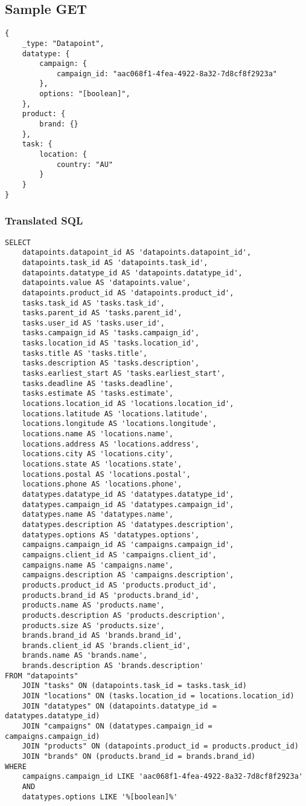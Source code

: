 \documentclass{article}
\begin{document}
\subsection{Sample GET}
\linespread{1}
\begin{lstlisting}
{
	_type: "Datapoint",
	datatype: {
		campaign: {
			campaign_id: "aac068f1-4fea-4922-8a32-7d8cf8f2923a"
		},
		options: "[boolean]",
	},
	product: {
		brand: {}
	},
	task: {
		location: {
			country: "AU"
		}
	}
}
\end{lstlisting}
\subsubsection{Translated SQL}
\begin{lstlisting}
SELECT
	datapoints.datapoint_id AS 'datapoints.datapoint_id',
	datapoints.task_id AS 'datapoints.task_id',
	datapoints.datatype_id AS 'datapoints.datatype_id',
	datapoints.value AS 'datapoints.value',
	datapoints.product_id AS 'datapoints.product_id',
	tasks.task_id AS 'tasks.task_id',
	tasks.parent_id AS 'tasks.parent_id',
	tasks.user_id AS 'tasks.user_id',
	tasks.campaign_id AS 'tasks.campaign_id',
	tasks.location_id AS 'tasks.location_id',
	tasks.title AS 'tasks.title',
	tasks.description AS 'tasks.description',
	tasks.earliest_start AS 'tasks.earliest_start',
	tasks.deadline AS 'tasks.deadline',
	tasks.estimate AS 'tasks.estimate',
	locations.location_id AS 'locations.location_id',
	locations.latitude AS 'locations.latitude',
	locations.longitude AS 'locations.longitude',
	locations.name AS 'locations.name',
	locations.address AS 'locations.address',
	locations.city AS 'locations.city',
	locations.state AS 'locations.state',
	locations.postal AS 'locations.postal',
	locations.phone AS 'locations.phone',
	datatypes.datatype_id AS 'datatypes.datatype_id',
	datatypes.campaign_id AS 'datatypes.campaign_id',
	datatypes.name AS 'datatypes.name',
	datatypes.description AS 'datatypes.description',
	datatypes.options AS 'datatypes.options',
	campaigns.campaign_id AS 'campaigns.campaign_id',
	campaigns.client_id AS 'campaigns.client_id',
	campaigns.name AS 'campaigns.name',
	campaigns.description AS 'campaigns.description',
	products.product_id AS 'products.product_id',
	products.brand_id AS 'products.brand_id',
	products.name AS 'products.name',
	products.description AS 'products.description',
	products.size AS 'products.size',
	brands.brand_id AS 'brands.brand_id',
	brands.client_id AS 'brands.client_id',
	brands.name AS 'brands.name',
	brands.description AS 'brands.description'
FROM "datapoints"
	JOIN "tasks" ON (datapoints.task_id = tasks.task_id)
	JOIN "locations" ON (tasks.location_id = locations.location_id)
	JOIN "datatypes" ON (datapoints.datatype_id = datatypes.datatype_id)
	JOIN "campaigns" ON (datatypes.campaign_id = campaigns.campaign_id)
	JOIN "products" ON (datapoints.product_id = products.product_id)
	JOIN "brands" ON (products.brand_id = brands.brand_id)
WHERE
	campaigns.campaign_id LIKE 'aac068f1-4fea-4922-8a32-7d8cf8f2923a'
	AND
	datatypes.options LIKE '%[boolean]%'
\end{lstlisting}
\end{document}
